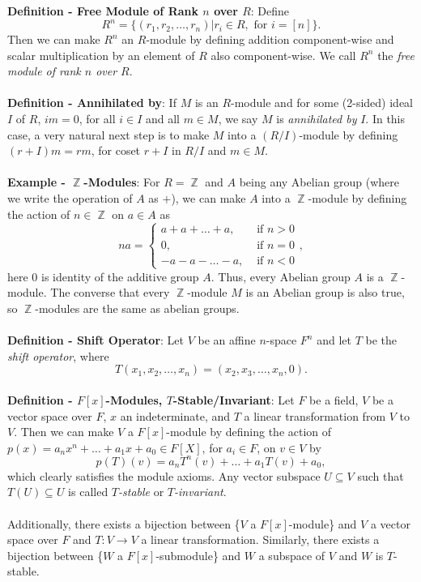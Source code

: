 \documentclass{article}
\DeclareMathOperator{\Z}{\mathbb{Z}}
\begin{document}
\textbf{Definition - Free Module of Rank $n$ over $R$}: Define $$R^n = \{(r_1, r_2, \dots, r_n) | r_i \in R, \text{ for }i = [n]\}.$$ Then we can make $R^n$ an $R$-module by defining addition component-wise and scalar multiplication by an element of $R$ also component-wise. We call $R^n$ the \textit{free module of rank $n$ over $R$}. \\ \\
\textbf{Definition - Annihilated by}:  If $M$ is an $R$-module and for some (2-sided) ideal $I$ of $R$, $im = 0$, for all $i \in I$ and all $m \in M$, we say $M$ is \textit{annihilated by} $I$. In this case, a very natural next step is to make $M$ into a $(R/I)$-module by defining 
$(r + I)m = rm$, for coset $r + I$ in $R/I$ and $m \in M$. \\ \\
\textbf{Example - $\Z$-Modules}: For $R = \Z$ and $A$ being any Abelian group (where we write the operation of $A$ as $+$), we can make $A$ into a $\Z$-module by defining the action of $n \in \Z$ on $a \in A$ as $$na = \begin{cases}
    a + a + \dots + a, & \text{ if } n > 0 \\
    0, & \text{ if } n = 0 \\
    -a - a - \dots - a, & \text{ if } n < 0
\end{cases},$$ here 0 is identity of the additive group $A$. Thus, every Abelian group $A$ is a $\Z$-module. The converse that every $\Z$-module $M$ is an Abelian group is also true, so $\Z$-modules are the same as abelian groups. \\ \\
\textbf{Definition - Shift Operator}: Let $V$ be an affine $n$-space $F^n$ and let $T$ be the \textit{shift operator}, where $$T(x_1, x_2, \dots, x_n) = (x_2, x_3, \dots, x_n, 0).$$ \\
\textbf{Definition - $F[x]$-Modules, $T$-Stable/Invariant}: Let $F$ be a field, $V$ be a vector space over $F$, $x$ an indeterminate, and $T$ a linear transformation from $V$ to $V$. Then we can  make $V$ a $F[x]$-module by defining the action of $p(x) = a_nx^n + \dots + a_1x + a_0 \in F[X]$, for $a_i \in F$, on $v \in V$ by $$p(T)(v) = a_n T^n(v) + \dots + a_1 T(v) + a_0,$$ which clearly satisfies the module axioms. Any vector subspace $U \subseteq V$ such that $T(U) \subseteq U$ is called \textit{$T$-stable} or \textit{$T$-invariant}. \\ \\
Additionally, there exists a bijection between \{$V$ a $F[x]$-module\} and $V$ a vector space over $F$ and $T: V \rightarrow V$ a linear transformation. Similarly, there exists a bijection between \{$W$ a $F[x]$-submodule\} and $W$ a subspace of $V$ and $W$ is $T$-stable. \\ \\
\end{document}
